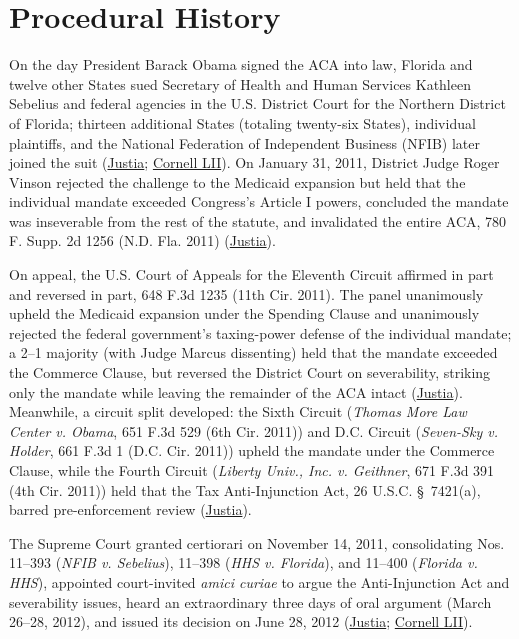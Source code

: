 \documentclass[12pt]{article}
\begin{document}
\section{Procedural History}
On the day President Barack Obama signed the ACA into law, Florida and twelve other States sued Secretary of Health and Human Services Kathleen Sebelius and federal agencies in the U.S. District Court for the Northern District of Florida; thirteen additional States (totaling twenty-six States), individual plaintiffs, and the National Federation of Independent Business (NFIB) later joined the suit (\href{https://supreme.justia.com/cases/federal/us/567/519/}{Justia}; \href{https://www.law.cornell.edu/supremecourt/text/11-393}{Cornell LII}). On January 31, 2011, District Judge Roger Vinson rejected the challenge to the Medicaid expansion but held that the individual mandate exceeded Congress's Article I powers, concluded the mandate was inseverable from the rest of the statute, and invalidated the entire ACA, 780 F. Supp. 2d 1256 (N.D. Fla. 2011) (\href{https://supreme.justia.com/cases/federal/us/567/519/}{Justia}).

On appeal, the U.S. Court of Appeals for the Eleventh Circuit affirmed in part and reversed in part, 648 F.3d 1235 (11th Cir. 2011). The panel unanimously upheld the Medicaid expansion under the Spending Clause and unanimously rejected the federal government's taxing-power defense of the individual mandate; a 2--1 majority (with Judge Marcus dissenting) held that the mandate exceeded the Commerce Clause, but reversed the District Court on severability, striking only the mandate while leaving the remainder of the ACA intact (\href{https://supreme.justia.com/cases/federal/us/567/519/}{Justia}). Meanwhile, a circuit split developed: the Sixth Circuit (\textit{Thomas More Law Center v. Obama}, 651 F.3d 529 (6th Cir. 2011)) and D.C. Circuit (\textit{Seven-Sky v. Holder}, 661 F.3d 1 (D.C. Cir. 2011)) upheld the mandate under the Commerce Clause, while the Fourth Circuit (\textit{Liberty Univ., Inc. v. Geithner}, 671 F.3d 391 (4th Cir. 2011)) held that the Tax Anti-Injunction Act, 26 U.S.C. \S~7421(a), barred pre-enforcement review (\href{https://supreme.justia.com/cases/federal/us/567/519/}{Justia}).

The Supreme Court granted certiorari on November 14, 2011, consolidating Nos. 11--393 (\textit{NFIB v. Sebelius}), 11--398 (\textit{HHS v. Florida}), and 11--400 (\textit{Florida v. HHS}), appointed court-invited \textit{amici curiae} to argue the Anti-Injunction Act and severability issues, heard an extraordinary three days of oral argument (March 26--28, 2012), and issued its decision on June 28, 2012 (\href{https://supreme.justia.com/cases/federal/us/567/519/}{Justia}; \href{https://www.law.cornell.edu/supremecourt/text/11-393}{Cornell LII}).
\end{document}
